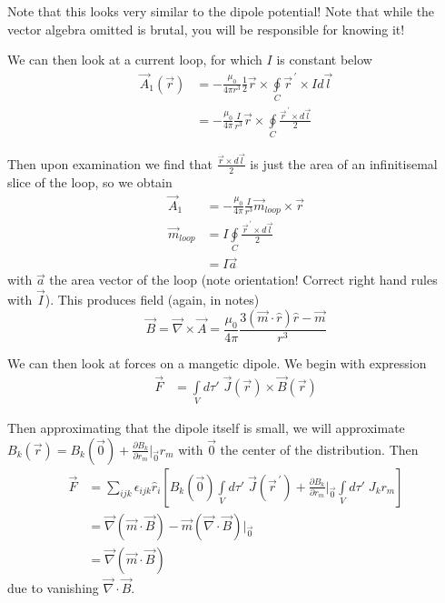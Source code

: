 \documentclass[10pt]{report}
\newcommand{\pd}[2]{\frac{\partial #1}{\partial#2}}
\newcommand{\pvec}[1]{\vec{#1}^{\,\prime}}
\begin{document}
Note that this looks very similar to the dipole potential! Note that while the vector algebra omitted is brutal, you will be responsible for knowing it! 

We can then look at a current loop, for which $I$ is constant below
\begin{align}
    \vec{A}_1(\vec{r}) &= -\frac{\mu_0}{4\pi r^3}\frac{1}{2}\vec{r}\times \oint\limits_C \pvec{r}\times Id\vec{l}\\
    &= -\frac{\mu_0}{4\pi}\frac{I}{r^3}\vec{r}\times \oint\limits_C \frac{\pvec{r} \times d\vec{l}}{2}
\end{align}

Then upon examination we find that $\frac{\vec{r}\times d\vec{l}}{2}$ is just the area of an infinitisemal slice of the loop, so we obtain
\begin{align}
    \vec{A}_1 &= -\frac{\mu_0}{4\pi}\frac{I}{r^3} \vec{m}_{loop} \times \vec{r}\\
    \vec{m}_{loop} &= I\oint\limits_C \frac{\pvec{r} \times d\vec{l}}{2}\\
    &= I\vec{a}
\end{align}
with $\vec{a}$ the area vector of the loop (note orientation! Correct right hand rules with $\vec{I}$). This produces field (again, in notes)
\begin{equation}
    \vec{B} = \vec{\nabla}\times \vec{A} = \frac{\mu_0}{4\pi}\frac{3(\vec{m}\cdot \hat{r}) \hat{r} - \vec{m}}{r^3}
\end{equation}

We can then look at forces on a mangetic dipole. We begin with expression
\begin{align}
    \vec{F} &= \int\limits_{V}^{}d\tau'\;\vec{J}(\vec{r}) \times \vec{B}(\vec{r})
\end{align}

Then approximating that the dipole itself is small, we will approximate $B_k(\vec{r}) = B_k(\vec{0}) + \pd{B_k}{r_m}\Big|_{\vec{0}}r_m$ with $\vec{0}$ the center of the distribution. Then
\begin{align}
    \vec{F} &= \sum_{ijk}^{}\epsilon_{ijk} \hat{r}_i\left[ B_k(\vec{0})\int\limits_{V}^{}d\tau'\;\vec{J}(\pvec{r}) + \pd{B_k}{r_m}\Big|_{\vec{0}}\int\limits_{V}^{}d\tau'\;J_kr_m \right]\\
    &= \vec{\nabla}(\vec{m}\cdot \vec{B}) - \vec{m}\left( \vec{\nabla}\cdot \vec{B} \right)\Big|_{\vec{0}}\\
    &= \vec{\nabla}\left( \vec{m}\cdot \vec{B} \right)
\end{align}
due to vanishing $\vec{\nabla}\cdot \vec{B}$.
\end{document}
